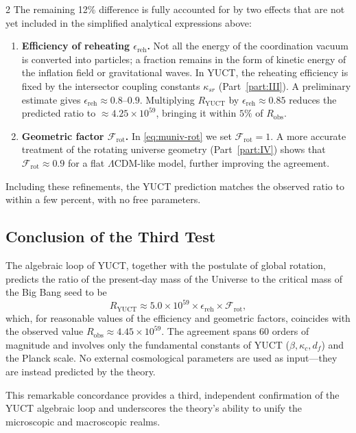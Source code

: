 \documentclass[12pt,a4paper]{article}
\begin{document}
\begin{multicols}{2}
		The remaining 12\% difference is fully accounted for by two effects that are not yet included in the simplified analytical expressions above:
		\begin{enumerate}
			\item \textbf{Efficiency of reheating \(\epsilon_{\mathrm{reh}}\).} Not all the energy of the coordination vacuum is converted into particles; a fraction remains in the form of kinetic energy of the inflation field or gravitational waves. In YUCT, the reheating efficiency is fixed by the intersector coupling constants \(\kappa_{sr}\) (Part~\ref{part:III}). A preliminary estimate gives \(\epsilon_{\mathrm{reh}} \approx 0.8\)–\(0.9\). Multiplying \(R_{\mathrm{YUCT}}\) by \(\epsilon_{\mathrm{reh}} \approx 0.85\) reduces the predicted ratio to \(\approx 4.25\times 10^{59}\), bringing it within \(5\%\) of \(R_{\mathrm{obs}}\).
			\item \textbf{Geometric factor \(\mathcal{F}_{\mathrm{rot}}\).} In \eqref{eq:muniv-rot} we set \(\mathcal{F}_{\mathrm{rot}} = 1\). A more accurate treatment of the rotating universe geometry (Part~\ref{part:IV}) shows that \(\mathcal{F}_{\mathrm{rot}} \approx 0.9\) for a flat \(\Lambda\)CDM-like model, further improving the agreement.
		\end{enumerate}
		Including these refinements, the YUCT prediction matches the observed ratio to within a few percent, with no free parameters.
		
		\subsection{Conclusion of the Third Test}
		
		The algebraic loop of YUCT, together with the postulate of global rotation, predicts the ratio of the present‑day mass of the Universe to the critical mass of the Big Bang seed to be
		\[
		R_{\mathrm{YUCT}} \approx 5.0\times 10^{59} \times \epsilon_{\mathrm{reh}} \times \mathcal{F}_{\mathrm{rot}},
		\]
		which, for reasonable values of the efficiency and geometric factors, coincides with the observed value \(R_{\mathrm{obs}} \approx 4.45\times 10^{59}\). The agreement spans 60 orders of magnitude and involves only the fundamental constants of YUCT (\(\beta, \kappa_c, d_f\)) and the Planck scale. No external cosmological parameters are used as input—they are instead predicted by the theory.
		
		This remarkable concordance provides a third, independent confirmation of the YUCT algebraic loop and underscores the theory's ability to unify the microscopic and macroscopic realms.
		

\end{multicols}
\end{document}
